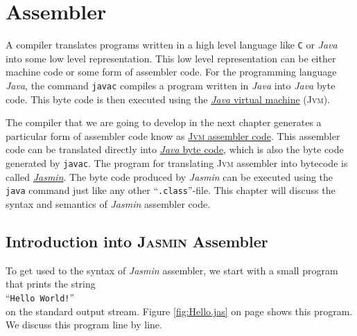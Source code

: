 \chapter{Assembler}
A compiler translates programs written in a high level language like \texttt{C} or
\textsl{Java} into some low level representation.  This low level representation can be
either machine code or some form of assembler code.  For the programming language \textsl{Java},
the command \texttt{javac} compiles a program written in \textsl{Java} into
\textsl{Java} byte code.  This byte code is then executed using the 
\href{http://en.wikipedia.org/wiki/Java_virtual_machine}{\textsl{Java} virtual machine}
(\textsc{Jvm}).

The compiler that we are going to
develop in the next chapter generates a particular form of assembler code know as
\href{http://jasmin.sourceforge.net}{\textsc{Jvm} assembler code}.
This assembler code can be translated directly into
\href{http://en.wikipedia.org/wiki/Java_bytecode}{\textsl{Java} byte code}, which 
is also the byte code generated by \texttt{javac}.  The program for translating \textsc{Jvm}
assembler into bytecode is called \href{http://jasmin.sourceforge.net}{\textsl{Jasmin}}.
The  byte code produced by \textsl{Jasmin} can be executed using the
\texttt{java} command just like any other ``\texttt{.class}''-file.  
This chapter will discuss the syntax and
semantics of \textsl{Jasmin} assembler code.



\section{Introduction into \textsc{Jasmin} Assembler}
To get used to the syntax of \textsl{Jasmin} assembler, we start with a small program that prints the
string 
\\[0.2cm]
\hspace*{1.3cm}
``\texttt{Hello World!}'' 
\\[0.2cm]
on the standard output stream.  Figure \ref{fig:Hello.jas} on page
\pageref{fig:Hello.jas} shows this program. We discuss this program line by line.

